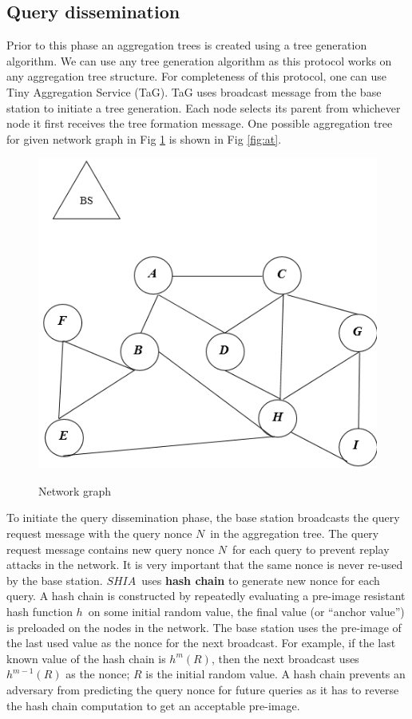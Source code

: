 	\subsection{Query dissemination}
		Prior to this phase an aggregation trees is created using a tree generation algorithm.
		We can use any tree generation algorithm as this protocol works on any aggregation tree structure.
		For completeness of this protocol, one can use Tiny Aggregation Service (TaG)\cite{madden2002tag}.
		TaG uses broadcast message from the base station to initiate a tree generation.
		Each node selects its parent from whichever node it first receives the tree formation message.
		One possible aggregation tree for given network graph in Fig \ref{fig:ng} is shown in Fig \ref{fig:at}. 
		\begin{figure}[hp]
			\centering
			\includegraphics[scale = 0.7]{images/network-graph.png}\\
			\caption{Network graph}
			\label{fig:ng}
		\end{figure}
		
		To initiate the query dissemination phase, the base station broadcasts the query request message with the query nonce $N$\ in the aggregation tree. 
		The query request message contains new query nonce $N$\ for each query to prevent replay attacks in the network.
		It is very important that the same nonce is never re-used by the base station.
		$SHIA$\ uses \textbf{hash chain} to generate new nonce for each query. 
		A hash chain is constructed by repeatedly evaluating a pre-image resistant hash function $h$\ on some initial random value, the final value (or ``anchor value'') is preloaded on the nodes in the network.
		The base station uses the pre-image of the last used  value as the nonce for the next broadcast.
		For example, if the last known value of the hash chain is $h^m(R)$, then the next broadcast uses $h^{m-1}(R)$ as the nonce; $R$ is the initial random value.  
		A hash chain prevents an adversary from predicting the query nonce for future queries as it has to reverse the hash chain computation to get an acceptable pre-image.

